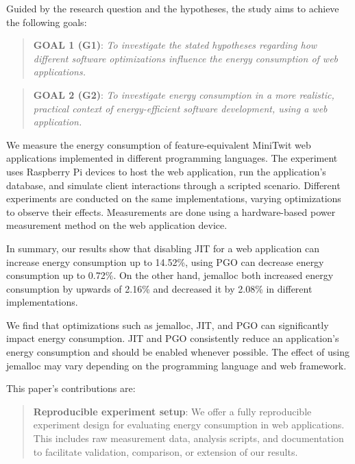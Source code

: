 \documentclass[../main.tex]{subfiles}
\begin{document}
Guided by the research question and the hypotheses, the study aims to achieve the following goals: 

\begin{quote}
    \textbf{GOAL 1 (G1)}: \emph{To investigate the stated hypotheses regarding how different software optimizations influence the energy consumption of web applications.}
\end{quote}

\begin{quote}
    \textbf{GOAL 2 (G2)}: \emph{To investigate energy consumption in a more realistic, practical context of energy-efficient software development, using a web application.}
\end{quote}

We measure the energy consumption of feature-equivalent MiniTwit web applications implemented in different programming languages. The experiment uses Raspberry Pi devices to host the web application, run the application’s database, and simulate client interactions through a scripted scenario. Different experiments are conducted on the same implementations, varying optimizations to observe their effects. Measurements are done using a hardware-based power measurement method on the web application device.

In summary, our results show that disabling JIT for a web application can increase energy consumption up to 14.52\%, using PGO can decrease energy consumption up to 0.72\%. On the other hand, jemalloc both increased energy consumption by upwards of 2.16\% and decreased it by 2.08\% in different implementations.

We find that optimizations such as jemalloc, JIT, and PGO can significantly impact energy consumption. JIT and PGO consistently reduce an application's energy consumption and should be enabled whenever possible. The effect of using jemalloc may vary depending on the programming language and web framework.

This paper's contributions are:

\begin{quote}
    \textbf{Reproducible experiment setup}: We offer a fully reproducible experiment design for evaluating energy consumption in web applications. This includes raw measurement data, analysis scripts, and documentation to facilitate validation, comparison, or extension of our results.
\end{quote}
\end{document}
